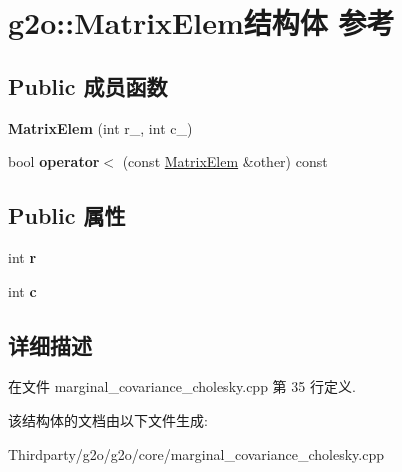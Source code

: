 \hypertarget{structg2o_1_1MatrixElem}{\section{g2o\-:\-:Matrix\-Elem结构体 参考}
\label{structg2o_1_1MatrixElem}
}
\subsection*{Public 成员函数}
\begin{DoxyCompactItemize}
\item 
\hypertarget{structg2o_1_1MatrixElem_a023cdda7c4681cd4867b9205e345e0e5}{{\bfseries Matrix\-Elem} (int r\-\_\-, int c\-\_\-)}\label{structg2o_1_1MatrixElem_a023cdda7c4681cd4867b9205e345e0e5}

\item 
\hypertarget{structg2o_1_1MatrixElem_a8f8e75f27d38f7f81d9458ec9695b7ad}{bool {\bfseries operator$<$} (const \hyperlink{structg2o_1_1MatrixElem}{Matrix\-Elem} \&other) const }\label{structg2o_1_1MatrixElem_a8f8e75f27d38f7f81d9458ec9695b7ad}

\end{DoxyCompactItemize}
\subsection*{Public 属性}
\begin{DoxyCompactItemize}
\item 
\hypertarget{structg2o_1_1MatrixElem_a5943163fa13505b2d2d9204f3fe61629}{int {\bfseries r}}\label{structg2o_1_1MatrixElem_a5943163fa13505b2d2d9204f3fe61629}

\item 
\hypertarget{structg2o_1_1MatrixElem_a32574586352669720ba955c1b8cafbc4}{int {\bfseries c}}\label{structg2o_1_1MatrixElem_a32574586352669720ba955c1b8cafbc4}

\end{DoxyCompactItemize}


\subsection{详细描述}


在文件 marginal\-\_\-covariance\-\_\-cholesky.\-cpp 第 35 行定义.



该结构体的文档由以下文件生成\-:\begin{DoxyCompactItemize}
\item 
Thirdparty/g2o/g2o/core/marginal\-\_\-covariance\-\_\-cholesky.\-cpp\end{DoxyCompactItemize}
